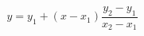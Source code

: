 \begin{equation}\label{eq:interpolation}
    y = y_1 + (x - x_1) \frac{y_2 - y_1}{x_2-x_1}
\end{equation}
